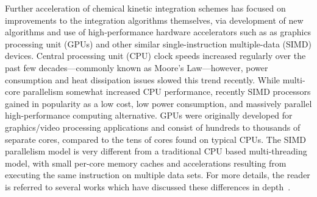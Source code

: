 \documentclass[preprint]{elsarticle}
\begin{document}
Further acceleration of chemical kinetic integration schemes has focused on improvements to the integration algorithms themselves, via development of new algorithms and use of high-performance hardware accelerators such as as graphics processing unit (GPUs) and other similar single-instruction multiple-data (SIMD) devices.
Central processing unit (CPU) clock speeds increased regularly over the past few decades---commonly known as Moore's Law---however, power consumption and heat dissipation issues slowed this trend recently.
While multi-core parallelism somewhat increased CPU performance, recently SIMD processors gained in popularity as a low cost, low power consumption, and massively parallel high-performance computing alternative.
GPUs were originally developed for graphics\slash video processing applications and consist of hundreds to thousands of separate cores, compared to the tens of cores found on typical CPUs.
The SIMD parallelism model is very different from a traditional CPU based multi-threading model, with small per-core memory caches and accelerations resulting from executing the same instruction on multiple data sets.
For more details, the reader is referred to several works which have discussed these differences in depth~\cite{Cruz:2011gc,Brodtkorb:2013hn,Niemeyer:2014hn}.
\end{document}
